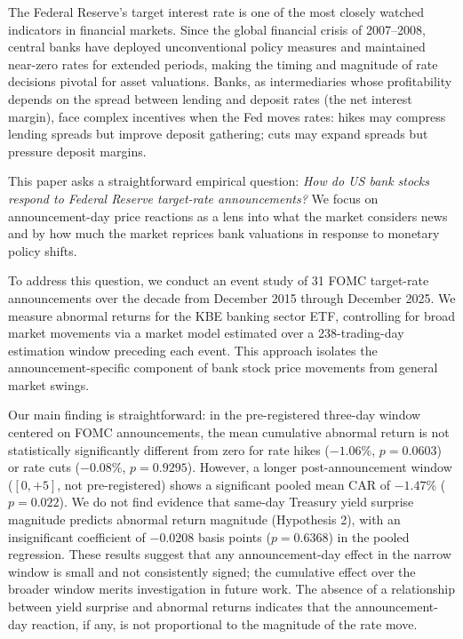 \documentclass[11pt]{article}
\begin{document}
The Federal Reserve's target interest rate is one of the most closely watched indicators in financial markets. Since the global financial crisis of 2007--2008, central banks have deployed unconventional policy measures and maintained near-zero rates for extended periods, making the timing and magnitude of rate decisions pivotal for asset valuations. Banks, as intermediaries whose profitability depends on the spread between lending and deposit rates (the net interest margin), face complex incentives when the Fed moves rates: hikes may compress lending spreads but improve deposit gathering; cuts may expand spreads but pressure deposit margins.

This paper asks a straightforward empirical question: \textit{How do US bank stocks respond to Federal Reserve target-rate announcements?} We focus on announcement-day price reactions as a lens into what the market considers news and by how much the market reprices bank valuations in response to monetary policy shifts.

To address this question, we conduct an event study of 31 FOMC target-rate announcements over the decade from December 2015 through December 2025. We measure abnormal returns for the KBE banking sector ETF, controlling for broad market movements via a market model estimated over a 238-trading-day estimation window preceding each event. This approach isolates the announcement-specific component of bank stock price movements from general market swings.

Our main finding is straightforward: in the pre-registered three-day window centered on FOMC announcements, the mean cumulative abnormal return is not statistically significantly different from zero for rate hikes ($-1.06\%$, $p = 0.0603$) or rate cuts ($-0.08\%$, $p = 0.9295$). However, a longer post-announcement window ($[0, +5]$, not pre-registered) shows a significant pooled mean CAR of $-1.47\%$ ($p = 0.022$). We do not find evidence that same-day Treasury yield surprise magnitude predicts abnormal return magnitude (Hypothesis 2), with an insignificant coefficient of $-0.0208$ basis points ($p = 0.6368$) in the pooled regression. These results suggest that any announcement-day effect in the narrow window is small and not consistently signed; the cumulative effect over the broader window merits investigation in future work. The absence of a relationship between yield surprise and abnormal returns indicates that the announcement-day reaction, if any, is not proportional to the magnitude of the rate move.
\end{document}
